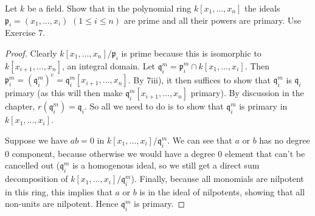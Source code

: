 \begin{exercise}
	Let $k$ be a field. Show that in the polynomial ring $k[x_1,\ldots,x_n]$ the ideals $\mathfrak{p}_i = (x_1,\ldots,x_i)$ $(1 \leq i \leq n)$ are prime and all their powers are primary. \ifhint Use Exercise 7.
\fi
\end{exercise}
\begin{proof}
	Clearly $k[x_{1}, \ldots ,x_n] / \mathfrak{p}_i $ is prime because this is isomorphic to $k[x_{i+1}, \ldots, x_n] $, an integral domain.
	Let $\mathfrak{q}_i^m = \mathfrak{p}_i^m \cap k[x_{1}, \ldots ,x_i] $.
	Then $\mathfrak{p}_i^m = (\mathfrak{q}_i^m)^e = \mathfrak{q}_i^m[x_{i+1}, \ldots , x_n]$.
	By 7iii), it then suffices to show that $\mathfrak{q}_i^m$ is $\mathfrak{q}_i$ primary (as this will then make $\mathfrak{q}_i^m[x_{i+1}, \ldots ,x_n]$ primary).
	By discussion in the chapter, $r(\mathfrak{q}_i^m) = \mathfrak{q}_i $.
	So all we need to do is to show that $\mathfrak{q}_i^m $ is primary in $k[x_{1}, \ldots ,x_i] $.

	Suppose we have $ab = 0 $ in $k[x_{1}, \ldots ,x_i] / \mathfrak{q}_i^m$.
	We can see that $a $ or $b $ has no degree 0 component, because otherwise we would have a degree $0 $ element that can't be cancelled out ($\mathfrak{q}_i^m $ is a homogenous ideal, so we still get a direct sum decomposition of $k[x_{1}, \ldots ,x_i] / \mathfrak{q}_i^m $).
	Finally, because all monomials are nilpotent in this ring, this implies that $a $ or $b $ is in the ideal of nilpotents, showing that all non-units are nilpotent.
	Hence $\mathfrak{q}_i^m $ is primary.
\end{proof}

